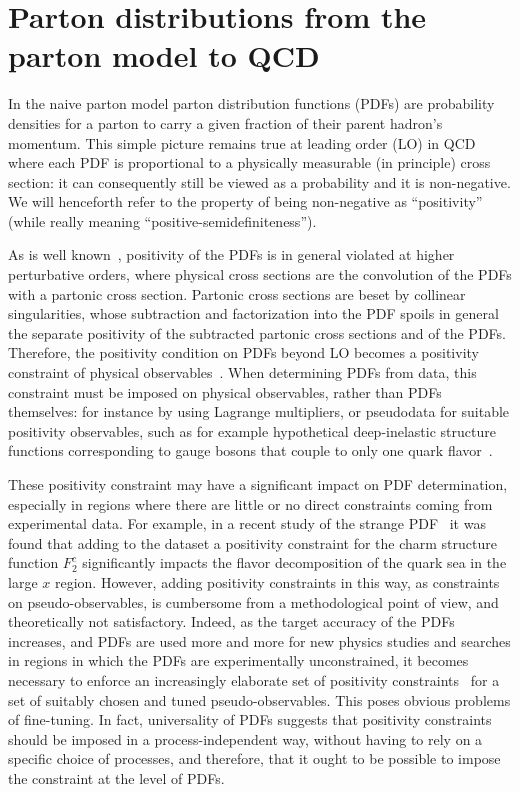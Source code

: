 \section{Parton distributions from the parton model to QCD}
\label{sec:pos/intro}

In the naive parton model parton distribution functions (PDFs) are probability
densities for a parton to carry a given fraction of their parent hadron's
momentum. This simple picture remains true at leading order (LO) in QCD where
each PDF is proportional to a physically measurable (in principle) cross
section: it can consequently still be viewed as a probability and it is
non-negative. We will henceforth refer to the property of being non-negative as
``positivity'' (while really meaning ``positive-semidefiniteness'').

As is well known~\cite{Altarelli:1998gn}, positivity of the PDFs is in general
violated at higher perturbative orders, where physical cross sections are the
convolution of the PDFs with a partonic cross section.
Partonic cross sections are beset by collinear singularities, whose subtraction
and factorization into the PDF spoils in general the separate positivity of the
subtracted partonic cross sections and of the PDFs.
Therefore, the positivity condition on PDFs beyond LO becomes a positivity
constraint of physical observables~\cite{Altarelli:1998gn,Forte:1998kd}. 
When determining
PDFs from data, this constraint must be imposed on physical observables, rather
than PDFs themselves: for instance by using Lagrange multipliers, or pseudodata
for suitable positivity observables, such as for example hypothetical
deep-inelastic structure functions corresponding to gauge bosons that couple to
only one quark flavor~\cite{Ball:2008by}.


These positivity constraint 
may have a significant impact on
PDF determination, especially in regions where there are little or no direct
constraints coming from experimental data. For example, in a recent
study of the strange PDF~\cite{Faura:2020oom} it was found that
adding to the dataset a positivity constraint for the charm structure
function $F_2^c$ significantly impacts the flavor decomposition of the
quark sea in the
large $x$ region. However, adding positivity constraints in this way,
as constraints on pseudo-observables, is cumbersome from a methodological point
of view, and theoretically not satisfactory. Indeed, as  the target
accuracy of the PDFs increases, and PDFs are used more and more
for new physics studies and searches in regions in which the PDFs are
experimentally 
unconstrained, it becomes necessary to enforce 
an increasingly
elaborate set of positivity
constraints~\cite{Ball:2010de,Ball:2014uwa} for
a set of suitably chosen and tuned pseudo-observables. This poses
obvious problems of fine-tuning. In fact,
universality of PDFs suggests that  positivity constraints
should be imposed in a process-independent way, without having to rely
on a specific choice  of processes, and therefore, that it ought to be
possible to impose the constraint at the level of PDFs.

